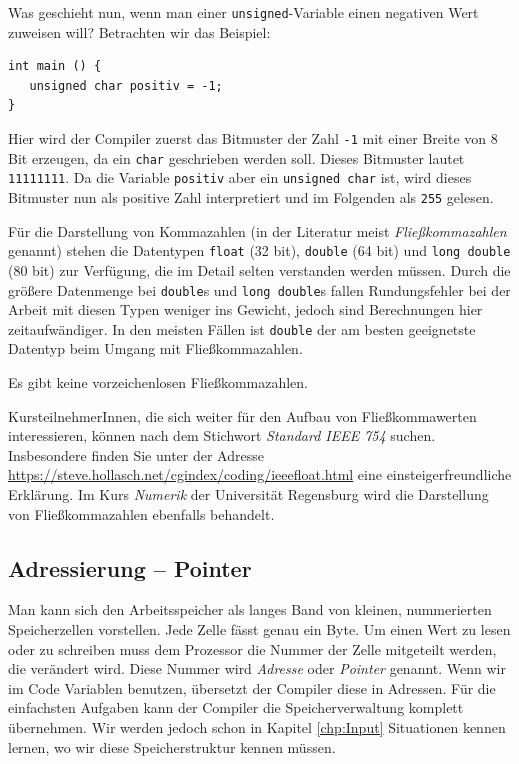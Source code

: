 Was geschieht nun, wenn man einer \texttt{unsigned}-Variable einen negativen Wert zuweisen will? Betrachten wir das Beispiel:
\begin{codebox}
\begin{verbatim}
int main () {
   unsigned char positiv = -1;
}
\end{verbatim}
\end{codebox}
Hier wird der Compiler zuerst das Bitmuster der Zahl \texttt{-1} mit einer Breite von 8 Bit erzeugen, da ein \texttt{char} geschrieben werden soll. Dieses Bitmuster lautet \texttt{11111111}. Da die Variable \texttt{positiv} aber ein \texttt{unsigned char} ist, wird dieses Bitmuster nun als positive Zahl interpretiert und im Folgenden als \texttt{255} gelesen.

Für die Darstellung von Kommazahlen (in der Literatur meist \emph{Fließkommazahlen} genannt) stehen die Datentypen \texttt{float} (32 bit), \texttt{double} (64 bit) und \texttt{long double} (80 bit) zur Verfügung, die im Detail selten verstanden werden müssen. Durch die größere Datenmenge bei \texttt{double}s und \texttt{long double}s fallen Rundungsfehler bei der Arbeit mit diesen Typen weniger ins Gewicht, jedoch sind Berechnungen hier zeitaufwändiger. In den meisten Fällen ist \texttt{double} der am besten geeignetste Datentyp beim Umgang mit Fließkommazahlen.

Es gibt keine vorzeichenlosen Fließkommazahlen.

KursteilnehmerInnen, die sich weiter für den Aufbau von Fließkommawerten interessieren, können nach dem Stichwort \emph{Standard IEEE 754} suchen. Insbesondere finden Sie unter der Adresse \url{https://steve.hollasch.net/cgindex/coding/ieeefloat.html} eine einsteigerfreundliche Erklärung. Im Kurs \emph{Numerik} der Universität Regensburg wird die Darstellung von Fließkommazahlen ebenfalls behandelt.


\subsection{Adressierung -- Pointer} \label{sec:Pointer}
Man kann sich den Arbeitsspeicher als langes Band von kleinen, nummerierten Speicherzellen vorstellen. Jede Zelle fässt genau ein Byte. Um einen Wert zu lesen oder zu schreiben muss dem Prozessor die Nummer der Zelle mitgeteilt werden, die verändert wird. Diese Nummer wird \emph{Adresse} oder \emph{Pointer} genannt. Wenn wir im Code Variablen benutzen, übersetzt der Compiler diese in Adressen. Für die einfachsten Aufgaben kann der Compiler die Speicherverwaltung komplett übernehmen. Wir werden jedoch schon in Kapitel \ref{chp:Input} Situationen kennen lernen, wo wir diese Speicherstruktur kennen müssen. 

